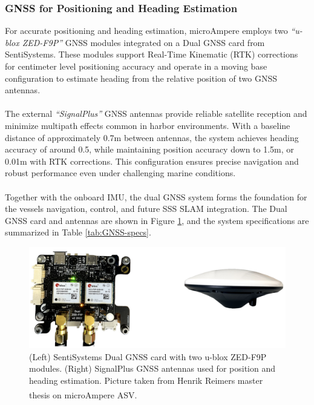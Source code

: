 \subsubsection{GNSS for Positioning and Heading Estimation}
For accurate positioning and heading estimation, microAmpere employs two \textit{``u-blox ZED-F9P''} GNSS modules integrated on a Dual GNSS card from SentiSystems. These modules support Real-Time Kinematic (RTK) corrections for centimeter level positioning accuracy and operate in a moving base configuration to estimate heading from the relative position of two GNSS antennas.
\\ \\
The external \textit{``SignalPlus''} GNSS antennas provide reliable satellite reception and minimize multipath effects common in harbor environments. With a baseline distance of approximately 0.7m between antennas, the system achieves heading accuracy of around 0.5\textdegree{}, while maintaining position accuracy down to 1.5m, or 0.01m with RTK corrections. This configuration ensures precise navigation and robust performance even under challenging marine conditions.
\\ \\
Together with the onboard IMU, the dual GNSS system forms the foundation for the vessels navigation, control, and future SSS SLAM integration. The Dual GNSS card and antennas are shown in Figure \ref{fig:microAmpere-gnss}, and the system specifications are summarized in Table \ref{tab:GNSS-specs}.
\begin{figure}[H]
    \centering
    \includegraphics[width=0.9\linewidth]{Pictures/Hardware/Sensors/GNSS_Card_and_GNSS_Antenna.png}
    \caption{(Left) SentiSystems Dual GNSS card with two u-blox ZED-F9P modules. (Right) SignalPlus GNSS antennas used for position and heading estimation. Picture taken from Henrik Reimers master thesis on microAmpere ASV.\textsuperscript{\cite{microAmpere_hardware_master_thesis1}}}
    \label{fig:microAmpere-gnss}
\end{figure}

